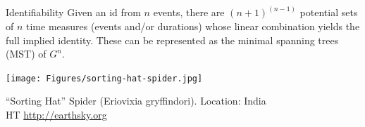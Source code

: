 \documentclass[20pt]{beamer}
\begin{document}

\begin{frame}[plain]
\Large

\begin{block}{Identifiability}
Given an id from $n$ events, there are $(n+1)^{(n-1)}$ potential sets of $n$
time measures (events and/or durations) whose linear combination yields the full
implied identity. These can be represented as the minimal spanning trees (MST)
of $G^n$.
\end{block}

\end{frame}

\begin{frame}

\begin{center}
\texttt{[image: Figures/sorting-hat-spider.jpg]}
\end{center}

``Sorting Hat'' Spider (Eriovixia gryffindori). Location: India\\
HT \url{http://earthsky.org}
\end{frame}
\end{document}
